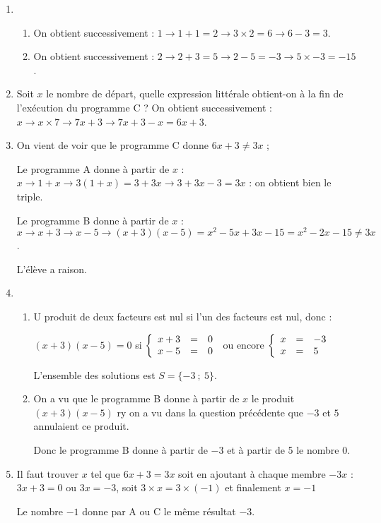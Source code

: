 \begin{enumerate}
	\item \begin{enumerate}
		\item %
On obtient successivement : $1 \to 1 + 1 = 2 \to 3 \times 2  = 6 \to 6 - 3 = 3$.	
		\item %
On obtient successivement : $2 \to 2 + 3 = 5 \to 2 - 5 = - 3 \to 5 \times - 3 = - 15$.
	\end{enumerate}
	\item Soit $x$ le nombre de départ, quelle expression littérale obtient-on à la fin de l'exécution du programme C ?
On obtient successivement : $x \to x \times 7 \to 7x + 3 \to 7x + 3 - x = 6x + 3$.	
	\item %
On vient de voir que le programme C donne $6x + 3 \ne 3x$ ;

Le programme A donne à partir de $x$ : $x \to 1 + x \to 3(1 + x) = 3 + 3x \to 3 + 3x -3 = 3x$ : on 
obtient bien le triple.

Le programme B donne à partir de $x$ : $x \to x + 3 \to x - 5 \to (x + 3)(x - 5) = x^2 - 5x + 3x - 15 = x^2 - 2x - 15 \ne 3x$.

L'élève a raison.
	\item \begin{enumerate}
		\item %
U produit de deux facteurs est nul si l'un des facteurs est nul, donc :

$(x + 3)(x - 5) = 0$ si $\left\{\begin{array}{l c l}
x + 3&=&0\\
x - 5&=&0
\end{array}\right.$ ou encore $\left\{\begin{array}{l c l}
x &=&- 3\\
x &=&5
\end{array}\right.$

L'ensemble des solutions est $S = \{- 3~;~5\}$.

		\item %
On a vu que le programme B donne à partir de $x$ le produit $(x + 3)(x - 5)$ ry on a vu dans la question précédente que $- 3$ et $5$ annulaient ce produit.

Donc le programme B donne à partir de $- 3$ et à partir de 5 le nombre $0$.
	\end{enumerate}
	\item %
Il faut trouver $x$ tel que $6x + 3 = 3x$ soit en ajoutant à chaque membre $- 3x$ : $3x + 3 = 0$ ou $3x = - 3$, soit $3\times x = 3 \times (- 1)$ et finalement $x = - 1$

Le nombre $- 1$ donne par A ou C le même résultat $- 3$.
\end{enumerate}

\vspace{0,5cm}

